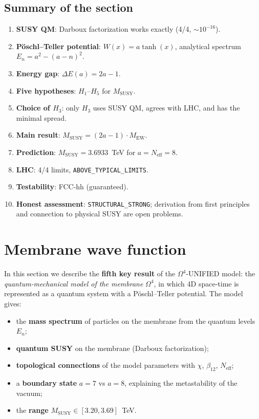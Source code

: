 \documentclass[11pt,a4paper]{article}
\newcommand{\Om}{\ensuremath{\Omega^4}}
\theoremstyle{definition}
\begin{document}
\subsection{Summary of the section}
\label{subsec:susy-summary}

\begin{enumerate}
    \item \textbf{SUSY QM}: Darboux factorization works
          exactly (4/4, $\sim 10^{-16}$).
    \item \textbf{P\"oschl--Teller potential}:
          $W(x) = a \tanh(x)$, analytical spectrum
          $E_n = a^2 - (a-n)^2$.
    \item \textbf{Energy gap}:
          $\Delta E(a) = 2a - 1$.
    \item \textbf{Five hypotheses}: $H_1$--$H_5$ for
          $M_{\text{SUSY}}$.
    \item \textbf{Choice of $H_3$}: only $H_3$ uses
          SUSY QM, agrees with LHC, and has the minimal
          spread.
    \item \textbf{Main result}:
          $M_{\text{SUSY}} = (2a-1) \cdot M_{\text{EW}}$.
    \item \textbf{Prediction}: $M_{\text{SUSY}} = 3.6933$~TeV
          for $a = N_{\text{eff}} = 8$.
    \item \textbf{LHC}: 4/4 limits, \texttt{ABOVE\_TYPICAL\_LIMITS}.
    \item \textbf{Testability}: FCC-hh (guaranteed).
    \item \textbf{Honest assessment}: \texttt{STRUCTURAL\_STRONG};
          derivation from first principles and connection to physical SUSY
          are open problems.
\end{enumerate}
\section{Membrane wave function}
\label{sec:membrane}

In this section we describe the \textbf{fifth key result}
of the $\Om$-UNIFIED model: the \emph{quantum-mechanical model of the membrane}
$\Om$, in which 4D space-time is represented as a
quantum system with a P\"oschl--Teller potential. The model
gives:
\begin{itemize}
    \item the \textbf{mass spectrum} of particles on the membrane from the quantum levels $E_n$;
    \item \textbf{quantum SUSY} on the membrane (Darboux factorization);
    \item \textbf{topological connections} of the model parameters with $\chi$, $\beta_{12}$, $N_{\text{eff}}$;
    \item a \textbf{boundary state} $a = 7$ vs $a = 8$, explaining the metastability of the vacuum;
    \item the \textbf{range} $M_{\text{SUSY}} \in [3.20, 3.69]$~TeV.
\end{itemize}
\end{document}
